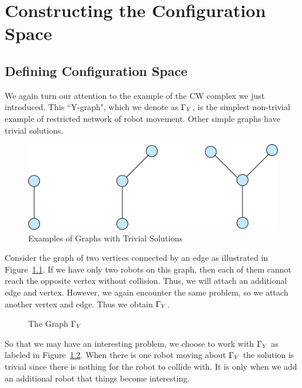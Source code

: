 \chapter{Constructing the Configuration Space}

\section{Defining Configuration Space}\label{sec:productspace}

We again turn our attention to the example of the CW complex we just introduced. This ``Y-graph", which we denote as $\Gamma_Y$, is the simplest non-trivial example of restricted network of robot movement. Other simple graphs have trivial solutions.

\begin{figure}[h]\label{fig:trivial}
\centering
\caption{Examples of Graphs with Trivial Solutions}
\includegraphics[scale=.5]{Building_Y.png}
\end{figure}


Consider the graph of two vertices connected by an edge as illustrated in Figure~\ref{fig:trivial}. If we have only two robots on this graph, then each of them cannot reach the opposite vertex without collision. Thus, we will attach an additional edge and vertex. However, we again encounter the same problem, so we attach another vertex and edge. Thus we obtain $\Gamma_Y$. 

\begin{figure}[h]
\caption{The Graph $\Gamma_Y$}
\centering
{}
\label{fig:maze}
\end{figure}

So that we may have an interesting problem, we choose to work with $\Gamma_Y$ as labeled in Figure~\ref{fig:maze}. When there is one robot moving about $\Gamma_Y$ the solution is trivial since there is nothing for the robot to collide with. It is only when we add an additional robot that things become interesting. 

